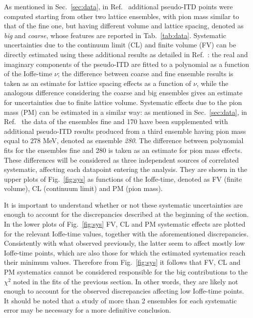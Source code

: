 %
As mentioned in Sec.~\ref{sec:data},
in Ref.~\cite{Joo:2019jct} additional pseudo-ITD points were computed starting
from other two lattice ensembles, with pion mass similar to that of the fine one, but having different volume and lattice spacing, 
denoted as \textit{big} and \textit{coarse}, whose features are reported in Tab.~\ref{tab:data}.
%
Systematic uncertainties due to the continuum limit (CL) and finite volume (FV) can be directly estimated using 
these additional results as detailed in Ref.~\cite{Joo:2019jct}: the real and imaginary components 
of the pseudo-ITD are fitted to a polynomial as a function of the Ioffe-time $\nu$; 
the difference between coarse and fine ensemble results is taken
as an estimate for lattice spacing effects as a function of $\nu$, while the analogous difference 
considering the coarse and big ensembles gives an estimate for uncertainties due to finite lattice volume.
%
Systematic effects due to the pion mass (PM) can be estimated in a similar way: 
as mentioned in Sec.~\ref{sec:data}, in Ref.~\cite{Joo:2020spy} the data of the ensembles fine and 170 have been supplemented with
additional pseudo-ITD results produced from a third ensemble having pion mass equal to $278$ MeV, denoted as ensemble
\textit{280}.  
The difference between polynomial fits for the ensembles fine and 280 is taken as an estimate for pion mass effects.
%
These differences will be considered as three independent sources of correlated systematic, affecting each datapoint
entering the analysis. 
They are shown in the upper plots of Fig.~\ref{fig:sys} as functions of the Ioffe-time, denoted as FV (finite volume),
CL (continuum limit) and PM (pion mass).

%
It is important to understand whether or not these systematic uncertainties are enough to
account for the discrepancies described at the beginning of the section.
In the lower plots of Fig.~\ref{fig:sys} FV, CL and PM systematic effects are plotted for the relevant Ioffe-time values, 
together with the aforementioned discrepancies. 
Consistently with what observed previously, the latter seem to affect mostly low Ioffe-time points, 
which are also those for which the estimated systematics reach their minimum values.
Therefore from Fig.~\ref{fig:sys} it follows that FV, CL and PM systematics cannot be considered responsible 
for the big contributions to the $\chi^2$ noted in the fits of the previous section. 
In other words, they are likely not enough to account for the observed discrepancies 
affecting low Ioffe-time points.
It should be noted that a study of more than 2 ensembles for each systematic error may be necessary for a more definitive conclusion.

